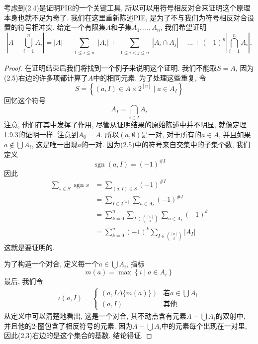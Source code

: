 \documentclass{ctexbook}
\begin{document}
	考虑到(2.4)是证明PIE的一个关键工具, 所以可以用符号相反对合来证明这个原理本身也就不足为奇了. 我们在这里重新陈述PIE, 是为了不与我们为符号相反对合设置的符号相冲突. 给定一个有限集$A$和子集$A_{1},...,A_{n}$, 我们希望证明
\begin{equation}
|A-\bigcup_{i=1}^{n} A_{i}|=|A|-\sum_{\substack{1\le i\le n}}|A_{i}|+\sum_{\substack{1\le i<j\le n}}|A_{i}\cap A_{j}|-...+(-1)^n|\bigcap_{i=1}^{n} A_{i}|.
\end{equation}
\begin{proof}
	在证明结束后我们将找到一个例子来说明这个证明. 我们不能取$S=A$, 因为(2.5)右边的许多项都计算了$A$中的相同元素. 为了处理这些重复, 令
	\begin{equation}
	S=\left\{(a,I)\in A\times 2^{[n]}\mid a\in A_{I}\right\}
	\end{equation}
	回忆这个符号
	\begin{equation}
		A_{I}=\bigcap_{i\in I}A_{i}
	\end{equation}
	注意, 他们在其中发挥了作用, 尽管从证明结果的原始陈述中并不明显, 就像定理1.9.3的证明一样. 注意到$A_{\emptyset}=A$. 所以$(a,\emptyset)$是一对, 对于所有的$a\in A$, 并且如果$a\notin \bigcup A_{i}$, 这是唯一出现$a$的一对. 因为(2.5)中的符号来自交集中的子集个数, 我们定义
	\[
	\operatorname{sgn}(a,I)=(-1)^{\# I}
	\]
	因此
	\[
	\begin{aligned}\sum_{s\in S}\operatorname{sgn}s
	&=\sum_{(a,I)\in S}(-1)^{\# I}\\
	&=\sum_{I\in 2^{[n]}}\sum_{a\in A_{I}}(-1)^{\#I}\\
	&=\sum_{k=0}^{n}\sum_{I\in \binom{[n]}{k}} \sum_{a\in A_{I}}(-1)^{k}\\
	&=\sum_{k=0}^{n}(-1)^{k}\sum_{I\in\binom{[n]}{k}}\left|A_{I}\right|\end{aligned}
	\]
	这就是要证明的.
	
	为了构造一个对合, 定义每一个$a\in \bigcup A_{i}$, 指标
	\[
	m(a)=\max \left\{i \mid a \in A_{i}\right\}
	\]
	最后, 我们令
	\[
	\begin{array}{c}
	\iota(a, I)=\left\{\begin{array}{ll}
	(a, I \Delta\{m(a)\}) & \text {若} a \in \bigcup A_{i} \\
	(a, I) & \text {其他}
	\end{array}\right.
	\end{array}
	\]
	从定义中可以清楚地看出, 这是一个对合, 其不动点含有元素$A-\bigcup A_{i}$的双射中, 并且他的2-圈包含了相反符号的元素. 因为$A-\bigcup A_{i}$中的元素每个出现在一对里, 因此(2,3)右边的是这个集合的基数. 结论得证.
\end{proof}
\end{document}
